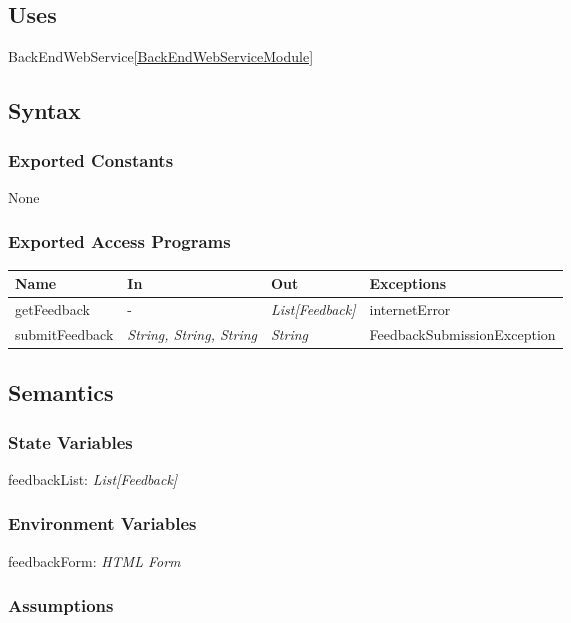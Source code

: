 \documentclass[12pt, titlepage]{article}
\begin{document}
\begin{itemize}
\subsection{Uses}
BackEndWebService\ref{BackEndWebServiceModule}

\subsection{Syntax}

\subsubsection{Exported Constants}
None

\subsubsection{Exported Access Programs}
\begin{center}
\begin{tabular}{p{4cm} p{3cm} p{3cm} p{3cm}}
\hline
\textbf{Name} & \textbf{In} & \textbf{Out} & \textbf{Exceptions} \\
\hline
getFeedback & - & \textit{List[Feedback]} & internetError \\
submitFeedback & \textit{String, String, String} & \textit{String} & FeedbackSubmissionException \\
\hline
\end{tabular}
\end{center}

\subsection{Semantics}

\subsubsection{State Variables}

feedbackList: \textit{List[Feedback]}\\

\subsubsection{Environment Variables}

feedbackForm: \textit{HTML Form}

\subsubsection{Assumptions}


\end{itemize}
\end{document}
